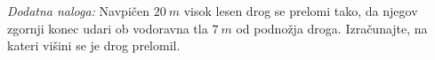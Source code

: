 \documentclass[addpoints]{exam}
\begin{document}
\begin{questions}
    \begin{solution}[4cm]
        
    \end{solution}













    \bonusquestion[3]
    \textit{Dodatna naloga:} Navpičen $20~m$ visok lesen drog se prelomi tako, 
    da njegov zgornji konec udari ob vodoravna tla $7~m$ od podnožja droga.
    Izračunajte, na kateri višini se je drog prelomil.




\end{questions}
\end{document}
